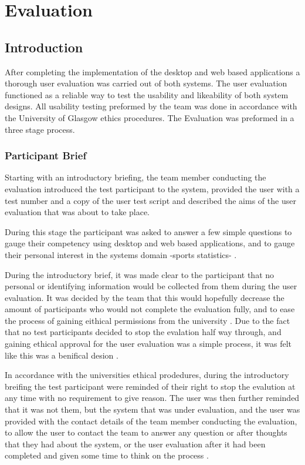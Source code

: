 \section{Evaluation}

\subsection{Introduction}

After completing the implementation of the desktop and web based applications a thorough user evaluation was carried out of both systems. The user evaluation functioned as a reliable way to test the usability and likeability of both system designs. All usability testing preformed by the team was done in accordance with the University of Glasgow ethics procedures. The Evaluation was preformed in a three stage process. 


\subsubsection{ Participant Brief }

Starting with an introductory briefing, the team member conducting the evaluation introduced the test participant to the system, provided the user with a test number and a copy of the user test script and described the aims of the user evaluation that was about to take place.  

During this stage the participant was asked to answer a few simple questions to gauge their competency using desktop and web based applications, and to gauge their personal interest in the systems domain -sports statistics- .

 During the introductory brief, it was made clear to the participant that no personal or identifying information would be collected from them during the user evaluation.  It was decided by the team that this would hopefully decrease the amount of participants who would not complete the evaluation fully, and to ease the process of gaining eithical permissions from the university . Due to the fact that no test participants decided to stop the evalation half way through, and gaining ethical approval for the user evaluation was a simple process, it was felt like this was a benifical desion . 

In accordance with the universities ethical prodedures, during the introductory breifing the test participant were reminded of their right to stop the evalution at any time with no requirement to give reason. The user was then further reminded that it was not them, but the system that was under evaluation, and the user was provided with the contact details of the team member conducting the evaluation, to allow the user to contact the team to answer any question or after thoughts that they had about the system, or the user evaluation after it had been completed and given some time to think on the process .

